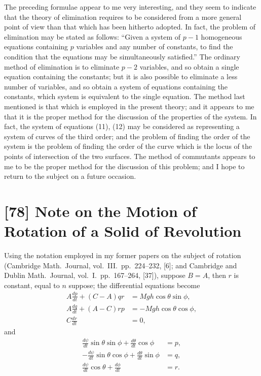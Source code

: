 \documentclass[11pt,a4paper]{book}
\begin{document}
The preceding formulae appear to me very interesting, and they seem to indicate that the theory of elimination requires to be considered from a more general point of view than that which has been hitherto adopted. In fact, the problem of elimination may be stated as follows: ``Given a system of $p - 1$ homogeneous equations containing $p$ variables and any number of constants, to find the condition that the equations may be simultaneously satisfied.'' The ordinary method of elimination is to eliminate $p - 2$ variables, and so obtain a single equation containing the constants; but it is also possible to eliminate a less number of variables, and so obtain a system of equations containing the constants, which system is equivalent to the single equation. The method last mentioned is that which is employed in the present theory; and it appears to me that it is the proper method for the discussion of the properties of the system. In fact, the system of equations (11), (12) may be considered as representing a system of curves of the third order; and the problem of finding the order of the system is the problem of finding the order of the curve which is the locus of the points of intersection of the two surfaces. The method of commutants appears to me to be the proper method for the discussion of this problem; and I hope to return to the subject on a future occasion.


\newpage
\section*{[78] Note on the Motion of Rotation of a Solid of Revolution}

\bigskip

Using the notation employed in my former papers on the subject of rotation (Cambridge Math.\ Journal, vol.~III.\ pp.~224--232, [6]; and Cambridge and Dublin Math.\ Journal, vol.~I.\ pp.~167--264, [37]), suppose $B = A$, then $r$ is constant, equal to $n$ suppose; the differential equations become
\begin{align}
A\frac{dp}{dt} + (C - A)qr &= Mgh\cos\theta\sin\phi, \tag{1} \\
A\frac{dq}{dt} + (A - C)rp &= -Mgh\cos\theta\cos\phi, \tag{2} \\
C\frac{dr}{dt} &= 0, \tag{3}
\end{align}
and
\begin{align}
\frac{d\psi}{dt}\sin\theta\sin\phi + \frac{d\theta}{dt}\cos\phi &= p, \tag{4} \\
-\frac{d\psi}{dt}\sin\theta\cos\phi + \frac{d\theta}{dt}\sin\phi &= q, \tag{5} \\
\frac{d\psi}{dt}\cos\theta + \frac{d\phi}{dt} &= r. \tag{6}
\end{align}
\end{document}
